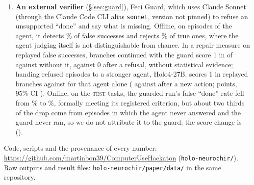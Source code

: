 \begin{enumerate}
\item \textbf{An external verifier} (\S\ref{sec:guard}), Feci Guard, which uses Claude Sonnet (through the Claude Code CLI alias \texttt{sonnet}, version not pinned) to refuse an unsupported ``done'' and say what is missing. Offline, on \gbEpisodes{} episodes of the agent, it detects \gbClaudeDet\% of false successes and rejects \gbClaudeRej\% of true ones, where the agent judging itself is not distinguishable from chance. In a repair measure on replayed false successes, branches continued with the guard score 1 in \fgRepRepairedGuard{} of \fgRepBranches{} against \fgRepRepairedNog{} without it, \fgRepSpecific{} against 0 after a refusal, without statistical evidence; handing refused episodes to a stronger agent, Holo4-27B, scores 1 in \rbGuardSucc{} replayed branches against \rbCtrlSucc{} for that agent alone (\rbGuardAfterAction{} against \rbCtrlAfterAction{} after a new action; \rbPrimDiff{} points, 95\% CI \rbPrimDiffCi). Online, on the \OgN{} \textsc{test} tasks, the guarded run's false ``done'' rate fell from \OgFdBase\% to \OgFdGuard\%, formally meeting its registered criterion, but about two thirds of the drop come from episodes in which the agent never answered and the guard never ran, so we do not attribute it to the guard; the score change is \OgScoreDiff{} (\OgScoreDiffCi).
\end{enumerate}
Code, scripts and the provenance of every number: \url{https://github.com/martinbon39/ComputerUseHackaton} (\texttt{holo-neurochir/}). Raw outputs and result files: \texttt{holo-neurochir/paper/data/} in the same repository.

